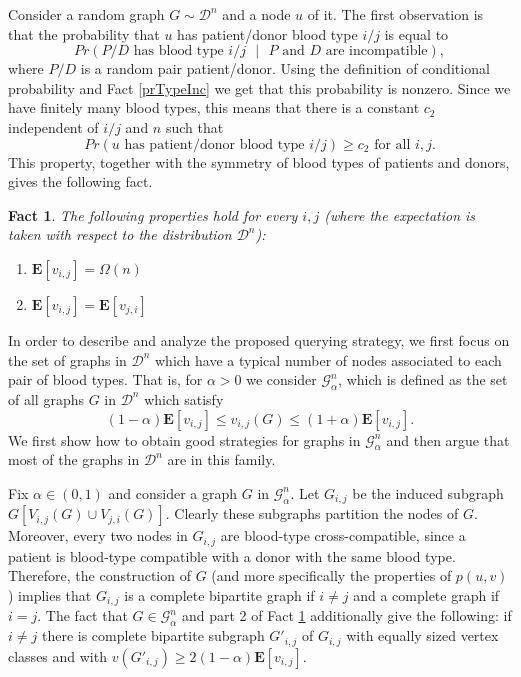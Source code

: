 \documentclass[12pt]{article}
\newtheorem{fact}{Fact}
\newcommand{\E}[1]{\mathbf{E}\left[#1\right]}
\begin{document}
		Consider a random graph $G \sim \mathcal{D}^n$ and a node $u$ of it. The first observation is that the probability that $u$ has patient/donor blood type $i/j$ is equal to $$Pr(\textrm{$P/D$ has blood type $i/j$ $|$ $P$ and $D$ are incompatible}),$$ where $P/D$ is a random pair patient/donor. Using the definition of conditional probability and Fact \ref{prTypeInc} we get that this probability is nonzero. Since we have finitely many blood types, this means that there is a constant $c_2$ independent of $i/j$ and $n$ such that 
\begin{equation}
			Pr(\textrm{$u$ has patient/donor blood type $i/j$}) \ge c_2 \textrm{ for all } i,j. \label{LPBloodType}
		\end{equation}
		This property, together with the symmetry of blood types of patients and donors, gives the following fact.
		
		\begin{fact} \label{sizeBloodTypes}
			The following properties hold for every $i,j$ (where the expectation is taken with respect to the distribution $\mathcal{D}^n$):
			\begin{enumerate}
				\item $\E{v_{i,j}} = \Omega(n)$
				\item $\E{v_{i,j}} = \E{v_{j,i}}$
			\end{enumerate}
		\end{fact}
		
		In order to describe and analyze the proposed querying strategy, we first focus on the set of graphs in $\mathcal{D}^n$ which have a typical number of nodes associated to each pair of blood types. That is, for $\alpha > 0$ we consider $\mathcal{G}^n_{\alpha}$, which is defined as the set of all graphs $G$ in $\mathcal{D}^n$ which satisfy $$(1 - \alpha) \E{v_{i,j}} \le v_{i,j}(G) \le (1 + \alpha) \E{v_{i,j}}.$$ We first show how to obtain good strategies for graphs in $\mathcal{G}^n_{\alpha}$ and then argue that most of the graphs in $\mathcal{D}^n$ are in this family. 
		
		Fix $\alpha \in (0, 1)$ and consider a graph $G$ in $\mathcal{G}^n_{\alpha}$. Let $G_{i,j}$ be the induced subgraph $G[V_{i,j}(G) \cup V_{j,i}(G)]$. Clearly these subgraphs partition the nodes of $G$. Moreover, every two nodes in $G_{i,j}$ are blood-type cross-compatible, since a patient is blood-type compatible with a donor with the same blood type. Therefore, the construction of $G$ (and more specifically the properties of $p(u,v)$) implies that $G_{i,j}$ is a complete bipartite graph if $i \neq j$ and a complete graph if $i = j$. The fact that $G \in \mathcal{G}^n_{\alpha}$ and part 2 of Fact \ref{sizeBloodTypes} additionally give the following: if $i \neq j$ there is complete bipartite subgraph $G'_{i,j}$ of $G_{i,j}$ with equally sized vertex classes and with $v(G'_{i,j}) \ge 2 (1 - \alpha) \E{v_{i,j}}$. 
		
\end{document}
